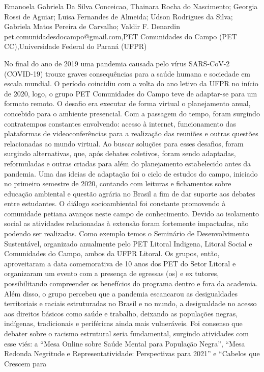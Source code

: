 Emanoela Gabriela Da Silva Conceicao, Thainara Rocha do Nascimento; Georgia Rossi de Aguiar; Luisa Fernandes de Almeida; Udson Rodrigues da Silva; Gabriela Matos Pereira de Carvalho; Valdir F. Denardin  pet.comunidadesdocampo@gmail.com,PET Comunidades do Campo (PET CC),Universidade Federal do Paraná (UFPR)

No final do ano de 2019 uma pandemia causada pelo vírus SARS-CoV-2 (COVID-19)
trouxe graves consequências para a saúde humana e sociedade em escala mundial. O período
coincidiu com a volta do ano letivo da UFPR no início de 2020, logo, o grupo PET Comunidades
do Campo teve de adaptar-se para um formato remoto. O desafio era executar de forma virtual o
planejamento anual, concebido para o ambiente presencial. Com a passagem do tempo, foram
surgindo contratempos constantes envolvendo: acesso à internet, funcionamento das plataformas
de videoconferências para a realização das reuniões e outras questões relacionadas ao mundo
virtual. Ao buscar soluções para esses desafios, foram surgindo alternativas, que, após debates
coletivos, foram sendo adaptadas, reformuladas e outras criadas para além do planejamento
estabelecido antes da pandemia.
Uma das ideias de adaptação foi o ciclo de estudos do campo, iniciado no primeiro
semestre de 2020, contando com leituras e fichamentos sobre educação ambiental e questão
agrária no Brasil a fim de dar suporte aos debates entre estudantes. O diálogo socioambiental foi
constante promovendo à comunidade petiana avanços neste campo de conhecimento.
Devido ao isolamento social as atividades relacionadas à extensão foram fortemente
impactadas, não podendo ser realizadas. Como exemplo temos o Seminário de Desenvolvimento
Sustentável, organizado anualmente pelo PET Litoral Indigena, Litoral Social e Comunidades do
Campo, ambos da UFPR Litoral. Os grupos, então, aproveitaram a data comemorativa de 10
anos dos PET do Setor Litoral e organizaram um evento com a presença de egressas (os) e ex
tutores, possibilitando compreender os benefícios do programa dentro e fora da academia.
Além disso, o grupo percebeu que a pandemia escancarou as desigualdades territoriais e
raciais estruturadas no Brasil e no mundo, a desigualdade no acesso aos direitos básicos como
saúde e trabalho, deixando as populações negras, indígenas, tradicionais e periféricas ainda mais
vulneráveis. Foi consenso que debater sobre o racismo estrutural seria fundamental, surgindo
atividades com esse viés: a “Mesa Online sobre Saúde Mental para População Negra”, “Mesa
Redonda Negritude e Representatividade: Perspectivas para 2021” e “Cabelos que Crescem para
